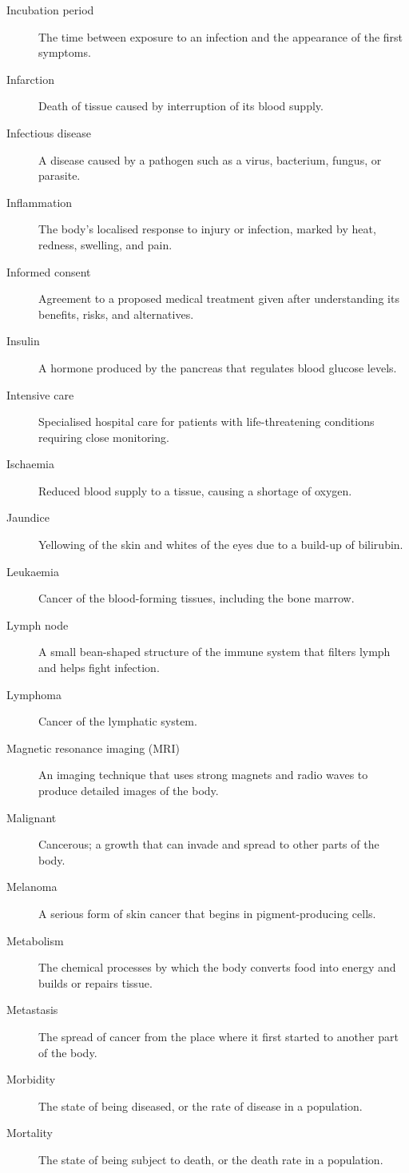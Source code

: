 \documentclass[12pt,oneside]{book}
\begin{document}
\begin{description}
  \item[Incubation period] The time between exposure to an infection and the appearance of the first symptoms.
  \item[Infarction] Death of tissue caused by interruption of its blood supply.
  \item[Infectious disease] A disease caused by a pathogen such as a virus, bacterium, fungus, or parasite.
  \item[Inflammation] The body's localised response to injury or infection, marked by heat, redness, swelling, and pain.
  \item[Informed consent] Agreement to a proposed medical treatment given after understanding its benefits, risks, and alternatives.
  \item[Insulin] A hormone produced by the pancreas that regulates blood glucose levels.
  \item[Intensive care] Specialised hospital care for patients with life-threatening conditions requiring close monitoring.
  \item[Ischaemia] Reduced blood supply to a tissue, causing a shortage of oxygen.
  \item[Jaundice] Yellowing of the skin and whites of the eyes due to a build-up of bilirubin.
  \item[Leukaemia] Cancer of the blood-forming tissues, including the bone marrow.
  \item[Lymph node] A small bean-shaped structure of the immune system that filters lymph and helps fight infection.
  \item[Lymphoma] Cancer of the lymphatic system.
  \item[Magnetic resonance imaging (MRI)] An imaging technique that uses strong magnets and radio waves to produce detailed images of the body.
  \item[Malignant] Cancerous; a growth that can invade and spread to other parts of the body.
  \item[Melanoma] A serious form of skin cancer that begins in pigment-producing cells.
  \item[Metabolism] The chemical processes by which the body converts food into energy and builds or repairs tissue.
  \item[Metastasis] The spread of cancer from the place where it first started to another part of the body.
  \item[Morbidity] The state of being diseased, or the rate of disease in a population.
  \item[Mortality] The state of being subject to death, or the death rate in a population.

\end{description}
\end{document}
